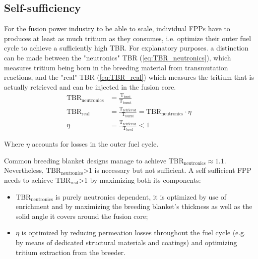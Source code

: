 \documentclass[a4paper,11pt,oneside]{report}
\begin{document}
\subsection{Self-sufficiency}

For the fusion power industry to be able to scale, individual FPPs have to produces at least as much tritium as they consumes, i.e. optimize their outer fuel cycle to achieve a sufficiently high TBR. For explanatory purposes. a distinction can be made between the "neutronics" TBR (\cref{eq:TBR_neutronics}), which measures tritium being born in the breeding material from transmutation reactions, and the "real" TBR (\cref{eq:TBR_real}) which measures the tritium that is actually retrieved and can be injected in the fusion core. 
\begin{align}
    \mathrm{TBR_{neutronics}}&= \frac{\mathrm{T_{bred}}}{\mathrm{T_{burnt}}} \label{eq:TBR_neutronics} \\
    \mathrm{TBR_{real}} &= \frac{\mathrm{T_{retrieved}}}{\mathrm{T_{burnt}}} =  \mathrm{TBR_{neutronics}} \cdot \eta  \label{eq:TBR_real}\\
    \eta &= \frac{\mathrm{T_{retrieved}}}{\mathrm{T_{bred}}}<1 \label{eq:eta}
\end{align}

Where $\eta$ accounts for losses in the outer fuel cycle. 

Common breeding blanket designs manage to achieve $\mathrm{TBR_{neutronics}}\approx1.1$\cite{forsberg_fusion_2020}. Nevertheless, $\mathrm{TBR_{neutronics}}$>1 is necessary but not sufficient. A self sufficient FPP needs to achieve $\mathrm{TBR_{real}}$>1 by maximizing both its components:
\begin{itemize}
    \item $\mathrm{TBR_{neutronics}}$ is purely neutronics dependent, it is optimized by use of  enrichment and by maximizing the breeding blanket's thickness as well as the solid angle it covers around the fusion core;
    \item $\eta$ is optimized by reducing permeation losses throughout the fuel cycle (e.g. by means of dedicated structural materials and coatings) and optimizing tritium extraction from the breeder.
\end{itemize}  
\end{document}
